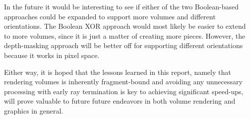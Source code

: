 \documentclass{report}
\begin{document}
In the future it would be interesting to see if either of the two Boolean-based
approaches could be expanded to support more volumes and different orientations.
The Boolean XOR approach would most likely be easier to extend to more volumes,
since it is just a matter of creating more pieces.  However, the depth-masking
approach will be better off for supporting different orientations because it
works in pixel space.

Either way, it is hoped that the lessons learned in this report, namely that
rendering volumes is inherently fragment-bound and avoiding any unnecessary
processing with early ray termination is key to achieving significant speed-ups,
will prove valuable to future future endeavors in both volume rendering and
graphics in general.


\newpage


\end{document}
